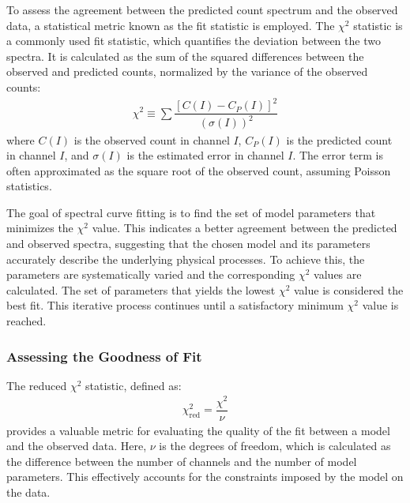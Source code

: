 To assess the agreement between the predicted count spectrum and the observed data, a statistical metric known as the fit statistic is employed. The $\chi^2$ statistic is a commonly used fit statistic, which quantifies the deviation between the two spectra. It is calculated as the sum of the squared differences between the observed and predicted counts, normalized by the variance of the observed counts:
				\begin{align}
					\chi^2\equiv\sum{\dfrac{[C(I)-C_P(I)]^2}{(\sigma(I))^2}} \label{eqn:chi-sq}
				\end{align}
				where $C(I)$ is the observed count in channel $I$, $C_P(I)$ is the predicted count in channel $I$, and $\sigma(I)$ is the estimated error in channel $I$. The error term is often approximated as the square root of the observed count, assuming Poisson statistics.
				
				The goal of spectral curve fitting is to find the set of model parameters that minimizes the $\chi^2$ value. This indicates a better agreement between the predicted and observed spectra, suggesting that the chosen model and its parameters accurately describe the underlying physical processes. To achieve this, the parameters are systematically varied and the corresponding $\chi^2$ values are calculated. The set of parameters that yields the lowest $\chi^2$ value is considered the best fit. This iterative process continues until a satisfactory minimum $\chi^2$ value is reached.
			
			\subsubsection{Assessing the Goodness of Fit}
				The reduced $\chi^2$ statistic, defined as:
				\begin{align}
					\chi^2_\text{red}=\dfrac{\chi^2}{\nu} \label{eqn:chisq-reduced}
				\end{align}
				provides a valuable metric for evaluating the quality of the fit between a model and the observed data. Here, $\nu$ is the degrees of freedom, which is calculated as the difference between the number of channels and the number of model parameters. This effectively accounts for the constraints imposed by the model on the data.
				
